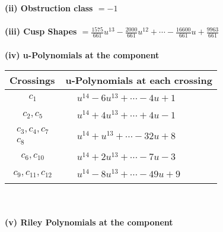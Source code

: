 \documentclass[1p]{elsarticle_modified}
\theoremstyle{definition}
\begin{document}
\flushleft \textbf{(ii) Obstruction class $= -1$}\\~\\
\flushleft \textbf{(iii) Cusp Shapes $= \frac{1575}{661} u^{13}-\frac{2000}{661} u^{12}+\cdots-\frac{16600}{661} u+\frac{9963}{661}$}\\~\\
\newpage\renewcommand{\arraystretch}{1}
\flushleft \textbf{(iv) u-Polynomials at the component}\newline \\
\begin{tabular}{m{50pt}|m{274pt}}
Crossings & \hspace{64pt}u-Polynomials at each crossing \\
\hline $$\begin{aligned}c_{1}\end{aligned}$$&$\begin{aligned}
&u^{14}-6 u^{13}+\cdots-4 u+1
\end{aligned}$\\
\hline $$\begin{aligned}c_{2},c_{5}\end{aligned}$$&$\begin{aligned}
&u^{14}+4 u^{13}+\cdots+4 u-1
\end{aligned}$\\
\hline $$\begin{aligned}c_{3},c_{4},c_{7}\\c_{8}\end{aligned}$$&$\begin{aligned}
&u^{14}+u^{13}+\cdots-32 u+8
\end{aligned}$\\
\hline $$\begin{aligned}c_{6},c_{10}\end{aligned}$$&$\begin{aligned}
&u^{14}+2 u^{13}+\cdots-7 u-3
\end{aligned}$\\
\hline $$\begin{aligned}c_{9},c_{11},c_{12}\end{aligned}$$&$\begin{aligned}
&u^{14}-8 u^{13}+\cdots-49 u+9
\end{aligned}$\\
\hline
\end{tabular}\\~\\
\newpage\renewcommand{\arraystretch}{1}
\flushleft \textbf{(v) Riley Polynomials at the component}\newline \\
\end{document}
